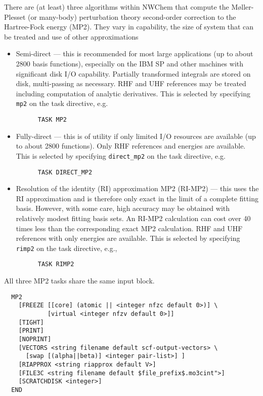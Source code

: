 %
%
\label{sec:mp2}
\label{sec:rimp2}

There are (at least) three algorithms within NWChem that compute the
M{\o}ller-Plesset (or many-body) perturbation theory second-order
correction to the Hartree-Fock energy (MP2).  They vary in capability,
the size of system that can be treated and use of other approximations
\begin{itemize}
\item Semi-direct --- this is recommended for most large applications
  (up to about 2800 basis functions), especially on the IBM SP and
  other machines with significant disk I/O capability.  Partially
  transformed integrals are stored on disk, multi-passing as necessary.
  RHF and UHF references may be treated including computation of
  analytic derivatives.  This is selected by specifying \verb+mp2+ on
  the task directive, e.g.
\begin{verbatim}
      TASK MP2
\end{verbatim}
\item Fully-direct --- this is of utility if only limited I/O
  resources are available (up to about 2800 functions).  Only RHF
  references and energies are available. This is selected by
  specifying \verb+direct_mp2+ on the task directive, e.g.
\begin{verbatim}
      TASK DIRECT_MP2
\end{verbatim}
\item Resolution of the identity (RI) approximation MP2 (RI-MP2) ---
  this uses the RI approximation and is therefore only exact in the
  limit of a complete fitting basis.  However, with some care, high
  accuracy may be obtained with relatively modest fitting basis sets.
  An RI-MP2 calculation can cost over 40 times less than the
  corresponding exact MP2 calculation.  RHF and UHF references with
  only energies are available.  This is selected by specifying
  \verb+rimp2+ on the task directive, e.g.,
\begin{verbatim}
      TASK RIMP2
\end{verbatim}
\end{itemize}

All three MP2 tasks share the same input block.

\begin{verbatim}
  MP2
    [FREEZE [[core] (atomic || <integer nfzc default 0>)] \
            [virtual <integer nfzv default 0>]]
    [TIGHT]
    [PRINT]
    [NOPRINT]
    [VECTORS <string filename default scf-output-vectors> \
      [swap [(alpha||beta)] <integer pair-list>] ]
    [RIAPPROX <string riapprox default V>]
    [FILE3C <string filename default $file_prefix$.mo3cint">]
    [SCRATCHDISK <integer>]
  END
\end{verbatim}

